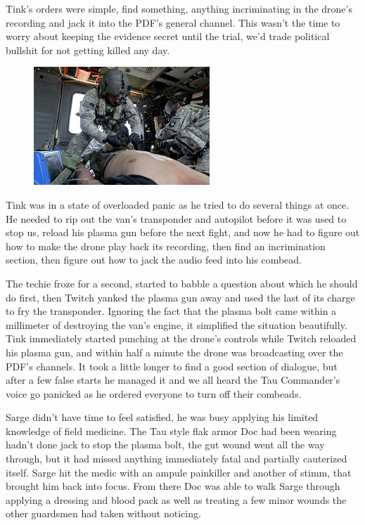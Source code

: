 Tink's orders were simple, find something, anything incriminating in the drone's recording and jack it into the PDF's general channel. 
This wasn't the time to worry about keeping the evidence secret until the trial, we'd trade political bullshit for not getting killed any day.

\begin{figure}
	\begin{center}
		\includegraphics[width=\figwidth]{pics/10/66.png}
	\end{center}
\end{figure}
Tink was in a state of overloaded panic as he tried to do several things at once. 
He needed to rip out the van's transponder and autopilot before it was used to stop us, reload his plasma gun before the next fight, and now he had to figure out how to make the drone play back its recording, then find an incrimination section, then figure out how to jack the audio feed into his combead. 


The techie froze for a second, started to babble a question about which he should do first, then Twitch yanked the plasma gun away and used the last of its charge to fry the transponder. 
Ignoring the fact that the plasma bolt came within a millimeter of destroying the van's engine, it simplified the situation beautifully. 
Tink immediately started punching at the drone's controls while Twitch reloaded his plasma gun, and within half a minute the drone was broadcasting over the PDF's channels. 
It took a little longer to find a good section of dialogue, but after a few false starts he managed it and we all heard the Tau Commander's voice go panicked as he ordered everyone to turn off their combeads.

Sarge didn't have time to feel satisfied, he was busy applying his limited knowledge of field medicine. 
The Tau style flak armor Doc had been wearing hadn't done jack to stop the plasma bolt, the gut wound went all the way through, but it had missed anything  immediately fatal and partially cauterized itself. 
Sarge hit the medic with an ampule painkiller and another of stimm, that brought him back into focus. 
From there Doc was able to walk Sarge through applying a dressing and blood pack as well as treating a few minor wounds the other guardsmen had taken without noticing.

